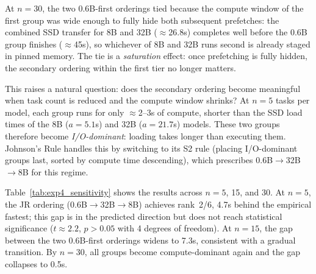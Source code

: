 \documentclass[logo,bsc,singlespacing,parskip,online]{infthesis}
\begin{document}
At $n=30$, the two 0.6B-first orderings tied because the compute window of the first group was wide enough to fully hide both subsequent prefetches: the combined SSD transfer for 8B and 32B ($\approx$26.8s) completes well before the 0.6B group finishes ($\approx$45s), so whichever of 8B and 32B runs second is already staged in pinned memory. The tie is a \emph{saturation} effect: once prefetching is fully hidden, the secondary ordering within the first tier no longer matters.

This raises a natural question: does the secondary ordering become meaningful when task count is reduced and the compute window shrinks? At $n=5$ tasks per model, each group runs for only $\approx$2--3s of compute, shorter than the SSD load times of the 8B ($a=5.1$s) and 32B ($a=21.7$s) models. These two groups therefore become \emph{I/O-dominant}: loading takes longer than executing them. Johnson's Rule handles this by switching to its S2 rule (placing I/O-dominant groups last, sorted by compute time descending), which prescribes 0.6B$\to$32B$\to$8B for this regime.

Table~\ref{tab:exp4_sensitivity} shows the results across $n=5$, 15, and 30. At $n=5$, the JR ordering (0.6B$\to$32B$\to$8B) achieves rank~2/6, 4.7s behind the empirical fastest; this gap is in the predicted direction but does not reach statistical significance ($t\approx2.2$, $p>0.05$ with 4 degrees of freedom). At $n=15$, the gap between the two 0.6B-first orderings widens to 7.3s, consistent with a gradual transition. By $n=30$, all groups become compute-dominant again and the gap collapses to 0.5s.
\end{document}
